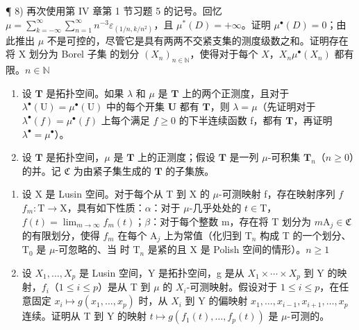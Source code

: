 ¶ 8) 再次使用第 IV 章第 1 节习题 5 的记号。回忆 \(\mu = \sum_{k=-\infty}^{\infty} \sum_{n=1}^{\infty} n^{-3} \varepsilon_{(1/n,k/n^2)}\)，且 \(\mu^{*}(D) = +\infty\)。证明 \(\mu^{\bullet}(D) = 0\)；由此推出 \(\mu\) 不是可控的，尽管它是具有两两不交紧支集的测度级数之和。证明存在将 X 划分为 Borel 子集  的划分 \((X_n)_{n \in \mathbb{N}}\)，使得对于每个 \(X\)，\(X_n\)\(\mu^{\bullet}(X_n)\) 都有限。\(n \in \mathbb{N}\)

\begin{enumerate}
\def\labelenumi{\arabic{enumi})}
\setcounter{enumi}{8}
\item
  设 \(\mathbf{T}\) 是拓扑空间。如果 \(\lambda\) 和 \(\mu\) 是 \(\mathbf{T}\) 上的两个正测度，且对于 \(\lambda^{\bullet}(\mathrm{U}) = \mu^{\bullet}(\mathrm{U})\) 中的每个开集 \(\mathbf{U}\) 都有 \(\mathbf{T}\)，则 \(\lambda = \mu\)（先证明对于 \(\lambda^{\bullet}(f) = \mu^{\bullet}(f)\) 上每个满足 \(f \geqslant 0\) 的下半连续函数 f，都有 \(\mathbf{T}\)，再证明 \(\lambda^{\bullet} = \mu^{\bullet}\)）。
\item
  设 \(\mathbf{T}\) 是拓扑空间，\(\mu\) 是 \(\mathbf{T}\) 上的正测度；假设 \(\mathbf{T}\) 是一列 \(\mu\)-可积集 \(\mathbf{T}_n\)（\(n \geqslant 0\)）的并。记 \(\mathfrak{C}\) 为由紧子集生成的 \(\mathbf{T}\) 的子集族。
\end{enumerate}

\begin{enumerate}
\def\labelenumi{\alph{enumi})}
\item
  设 X 是 Lusin 空间。对于每个从 T 到 X 的 \(\mu\)-可测映射 f，存在映射序列 \(f\)\(f_m: \mathrm{T} \to \mathrm{X}\)，具有如下性质：\(\alpha\)：对于 \(\mu\)-几乎处处的 \(t \in \mathrm{T}\)，\(f(t) = \lim_{m \to \infty} f_m(t)\)；\(\beta\)：对于每个整数 m，存在将 T 划分为 \(m\)\(\mathrm{A}_j \in \mathfrak{C}\) 的有限划分，使得 \(f_m\) 在每个 \(\mathrm{A}_j\) 上为常值（化归到 \(\mathrm{T}_n\) 构成 T 的一个划分、\(\mathrm{T}_0\) 是 \(\mu\)-可忽略的、当  时 \(\mathrm{T}_n\) 是紧的且 X 是 Polish 空间的情形）。\(n \geqslant 1\)
\item
  设 \(X_{1},\ldots,X_{p}\) 是 Lusin 空间，Y 是拓扑空间，g 是从 \(X_{1}\times\cdots\times X_{p}\) 到 Y 的映射，\(f_{i}\)（\(1\leqslant i\leqslant p\)）是从 T 到 \(\mu\) 的 \(X_{i}\)-可测映射。假设对于 \(1\leqslant i\leqslant p\)，在任意固定 \(x_{i}\mapsto g(x_{1},\ldots,x_{p})\) 时，从 \(X_{i}\) 到 Y 的偏映射 \(x_{1},\ldots,x_{i-1},x_{i+1},\ldots,x_{p}\) 连续。证明从 T 到 Y 的映射 \(t\mapsto g(f_{1}(t),\ldots,f_{p}(t))\) 是 \(\mu\)-可测的。
\end{enumerate}

